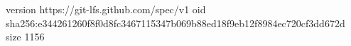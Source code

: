 version https://git-lfs.github.com/spec/v1
oid sha256:e344261260f8f0d8fc3467115347b069b88ed18f9eb12f8984ec720cf3dd672d
size 1156
